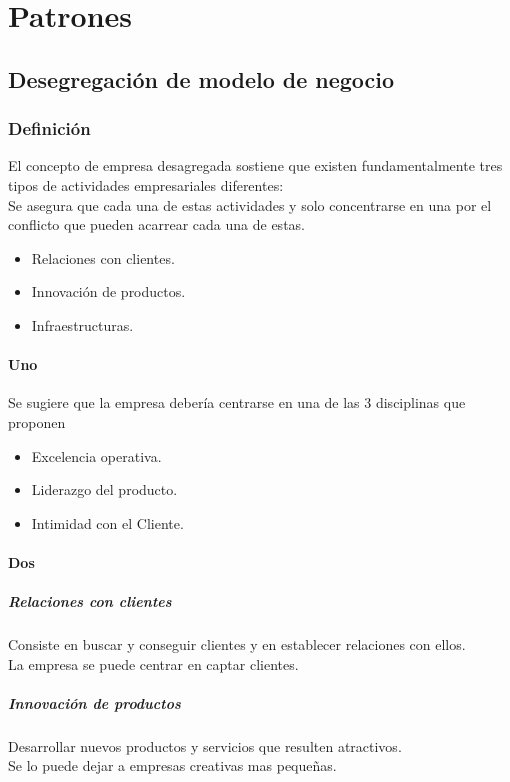 \documentclass[11pt]{book}
\begin{document}
\part{Patrones}
\let\cleardoublepage\clearpage
\let\cleardoublepage\clearpage
\chapter{Desegregación de modelo de negocio}
\section{Definición}
El concepto de empresa desagregada sostiene que existen fundamentalmente tres tipos de actividades empresariales diferentes:\\
Se asegura que cada una de estas actividades y solo concentrarse en una por el conflicto que pueden acarrear cada una de estas. \\
\begin{itemize}
\item Relaciones con clientes.
\item Innovación de productos.
\item Infraestructuras.  
\end{itemize}
\subsection{Uno}
Se sugiere que la empresa debería centrarse en una de las 3 disciplinas que proponen
\begin{itemize}
\item Excelencia operativa.
\item Liderazgo del producto.
\item Intimidad con el Cliente.
\end{itemize}
\subsection{Dos}
\subsubsection{Relaciones con clientes}
Consiste en buscar y conseguir clientes y en establecer relaciones con ellos.\\ La empresa se puede centrar en captar clientes.
\subsubsection{Innovación de productos}
Desarrollar nuevos productos y servicios que resulten atractivos.\\
Se lo puede dejar a empresas creativas mas pequeñas.
\end{document}
